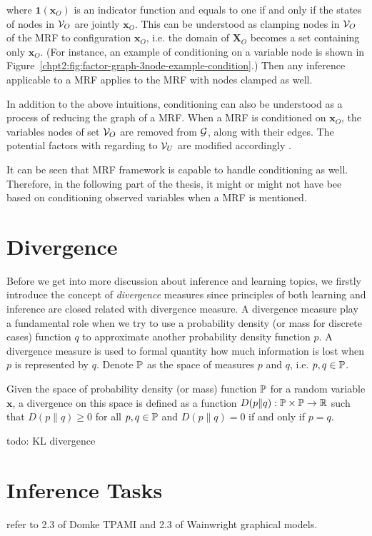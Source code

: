 where $\bm{1}(\bm{x}_O)$ is an indicator function and equals to one if and only if the states of nodes in $\mathcal{V}_O$ are jointly $\bm{x}_O$. This can be understood as clamping nodes in $\mathcal{V}_O$ of the MRF to configuration $\bm{x}_O$, i.e. the domain of $\bm{X}_O$ becomes a set containing only $\bm{x}_O$. (For instance, an example of conditioning on a variable node is shown in Figure~\ref{chpt2:fig:factor-graph-3node-example-condition}.) Then any inference applicable to a MRF applies to the MRF with nodes clamped as well.

In addition to the above intuitions, conditioning can also be understood as a process of reducing the graph of a MRF. When a MRF is conditioned on $\bm{x}_O$, the variables nodes of set $\mathcal{V}_O$ are removed from $\mathcal{G}$, along with their edges. The potential factors with regarding to $\mathcal{V}_U$ are modified accordingly \cite[Chapter~4.2.3]{koller2009pgm}.

It can be seen that MRF framework is capable to handle conditioning as well. Therefore, in the following part of the thesis, it might or might not have bee based on conditioning observed variables when a MRF is mentioned.

\section{Divergence}
Before we get into more discussion about inference and learning topics, we firstly introduce the concept of \textit{divergence} measures since principles of both learning and inference are closed related with divergence measure.
A divergence measure play a fundamental role when we try to use a probability density (or mass for discrete cases) function $q$ to approximate another probability density function $p$. A divergence measure is used to formal quantity how much information is lost when $p$ is represented by $q$. Denote $\mathbb{P}$ as the space of measures $p$ and $q$, i.e. $p, q \in \mathbb{P}$.
\begin{definition}
  Given the space of probability density (or mass) function $\mathbb{P}$ for a random variable $\bm{x}$, a divergence on this space is defined as a function $D(p\|q): \mathbb{P} \times \mathbb{P} \rightarrow \mathbb{R}$ such that $D(p\|q) \geq 0$ for all $p, q \in \mathbb{P}$ and $D(p\|q)=0$ if and only if $p=q$.
\end{definition}

todo: KL divergence


  
\section{Inference Tasks}
\label{sec:background-graphial-reppresentation}
refer to 2.3 of Domke TPAMI and 2.3 of Wainwright graphical models.


